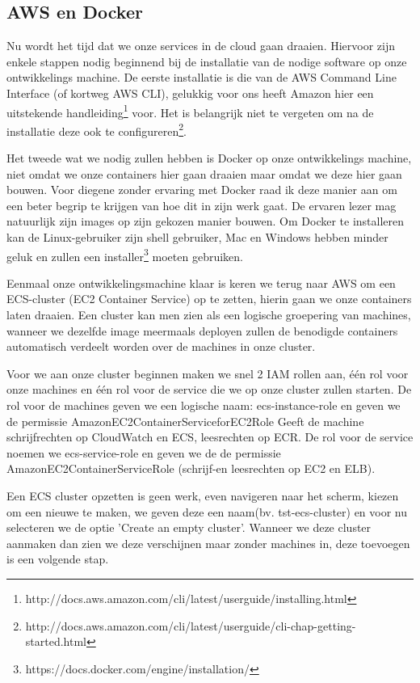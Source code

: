\documentclass{article}
\begin{document}
	\subsection{AWS en Docker}
	Nu wordt het tijd dat we onze services in de cloud gaan draaien. Hiervoor zijn enkele stappen nodig beginnend bij de installatie van de nodige software op onze ontwikkelings machine. De eerste installatie is die van de AWS Command Line Interface (of kortweg AWS CLI), gelukkig voor ons heeft Amazon hier een uitstekende handleiding\footnote{http://docs.aws.amazon.com/cli/latest/userguide/installing.html}
	voor. Het is belangrijk niet te vergeten om na de installatie deze ook te configureren\footnote{http://docs.aws.amazon.com/cli/latest/userguide/cli-chap-getting-started.html}.
	\par
	Het tweede wat we nodig zullen hebben is Docker op onze ontwikkelings machine, niet omdat we onze containers hier gaan draaien maar omdat we deze hier gaan bouwen. Voor diegene zonder ervaring met Docker raad ik deze manier aan om een beter begrip te krijgen van hoe dit in zijn werk gaat. De ervaren lezer mag natuurlijk zijn images op zijn gekozen manier bouwen. Om Docker te installeren kan de Linux-gebruiker zijn shell gebruiker, Mac en Windows hebben minder geluk en zullen een installer\footnote{https://docs.docker.com/engine/installation/} moeten gebruiken.
	\par
	Eenmaal onze ontwikkelingsmachine klaar is keren we terug naar AWS om een ECS-cluster (EC2 Container Service) op te zetten, hierin gaan we onze containers laten draaien. Een cluster kan men zien als een logische groepering van machines, wanneer we dezelfde image meermaals deployen zullen de benodigde containers automatisch verdeelt worden over de machines in onze cluster.
	\par
	Voor we aan onze cluster beginnen maken we snel 2 IAM rollen aan, één rol voor onze machines en één rol voor de service die we op onze cluster zullen starten. De rol voor de machines geven we een logische naam: ecs-instance-role en geven we de permissie AmazonEC2ContainerServiceforEC2Role {Geeft de machine schrijfrechten op CloudWatch en ECS, leesrechten op ECR}. De rol voor de service noemen we ecs-service-role en geven we de de permissie AmazonEC2ContainerServiceRole (schrijf-en leesrechten op EC2 en ELB). 
	\par	
	 Een ECS cluster opzetten is geen werk, even navigeren naar het scherm, kiezen om een nieuwe te maken, we geven deze een naam(bv. tst-ecs-cluster) en voor nu selecteren we de optie 'Create an empty cluster'. Wanneer we deze cluster aanmaken dan zien we deze verschijnen maar zonder machines in, deze toevoegen is een volgende stap.
\end{document}

